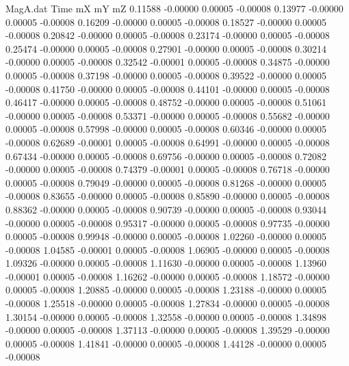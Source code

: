 \begin{filecontents}{MagA.dat}
Time mX mY mZ
   0.11588   -0.00000    0.00005   -0.00008
   0.13977   -0.00000    0.00005   -0.00008
   0.16209   -0.00000    0.00005   -0.00008
   0.18527   -0.00000    0.00005   -0.00008
   0.20842   -0.00000    0.00005   -0.00008
   0.23174   -0.00000    0.00005   -0.00008
   0.25474   -0.00000    0.00005   -0.00008
   0.27901   -0.00000    0.00005   -0.00008
   0.30214   -0.00000    0.00005   -0.00008
   0.32542   -0.00001    0.00005   -0.00008
   0.34875   -0.00000    0.00005   -0.00008
   0.37198   -0.00000    0.00005   -0.00008
   0.39522   -0.00000    0.00005   -0.00008
   0.41750   -0.00000    0.00005   -0.00008
   0.44101   -0.00000    0.00005   -0.00008
   0.46417   -0.00000    0.00005   -0.00008
   0.48752   -0.00000    0.00005   -0.00008
   0.51061   -0.00000    0.00005   -0.00008
   0.53371   -0.00000    0.00005   -0.00008
   0.55682   -0.00000    0.00005   -0.00008
   0.57998   -0.00000    0.00005   -0.00008
   0.60346   -0.00000    0.00005   -0.00008
   0.62689   -0.00001    0.00005   -0.00008
   0.64991   -0.00000    0.00005   -0.00008
   0.67434   -0.00000    0.00005   -0.00008
   0.69756   -0.00000    0.00005   -0.00008
   0.72082   -0.00000    0.00005   -0.00008
   0.74379   -0.00001    0.00005   -0.00008
   0.76718   -0.00000    0.00005   -0.00008
   0.79049   -0.00000    0.00005   -0.00008
   0.81268   -0.00000    0.00005   -0.00008
   0.83655   -0.00000    0.00005   -0.00008
   0.85890   -0.00000    0.00005   -0.00008
   0.88362   -0.00000    0.00005   -0.00008
   0.90739   -0.00000    0.00005   -0.00008
   0.93044   -0.00000    0.00005   -0.00008
   0.95317   -0.00000    0.00005   -0.00008
   0.97735   -0.00000    0.00005   -0.00008
   0.99948   -0.00000    0.00005   -0.00008
   1.02260   -0.00000    0.00005   -0.00008
   1.04585   -0.00001    0.00005   -0.00008
   1.06905   -0.00000    0.00005   -0.00008
   1.09326   -0.00000    0.00005   -0.00008
   1.11630   -0.00000    0.00005   -0.00008
   1.13960   -0.00001    0.00005   -0.00008
   1.16262   -0.00000    0.00005   -0.00008
   1.18572   -0.00000    0.00005   -0.00008
   1.20885   -0.00000    0.00005   -0.00008
   1.23188   -0.00000    0.00005   -0.00008
   1.25518   -0.00000    0.00005   -0.00008
   1.27834   -0.00000    0.00005   -0.00008
   1.30154   -0.00000    0.00005   -0.00008
   1.32558   -0.00000    0.00005   -0.00008
   1.34898   -0.00000    0.00005   -0.00008
   1.37113   -0.00000    0.00005   -0.00008
   1.39529   -0.00000    0.00005   -0.00008
   1.41841   -0.00000    0.00005   -0.00008
   1.44128   -0.00000    0.00005   -0.00008

\end{filecontents}
